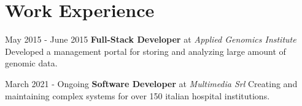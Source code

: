 \section*{Work Experience}
May 2015 - June 2015 \textbf{Full-Stack Developer} at \textit{Applied Genomics Institute} Developed a management portal for storing and analyzing large amount of genomic data.

March 2021 - Ongoing \textbf{Software Developer} at \textit{Multimedia Srl} Creating and maintaining complex systems for over 150 italian hospital institutions.
